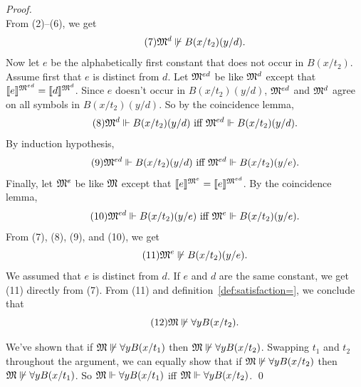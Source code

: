 \begin{proof}
\begin{equation}
  \end{equation}
  From (2)--(6), we get
  \begin{equation}\tag{7}
    \mathfrak{M}^d \not\Vdash B(x/t_2)(y/d).
  \end{equation}
  Now let $e$ be the alphabetically first constant that does not occur in $B(x/t_2)$.
  Assume first that $e$ is distinct from $d$.
  Let $\mathfrak{M}^{ed}$ be like $\mathfrak{M}^d$ except that
  $\llbracket e \rrbracket^{\mathfrak{M}^{ed}} = \llbracket d \rrbracket^{\mathfrak{M}^d}$.
  Since $e$ doesn't occur in $B(x/t_2)(y/d)$,
  $\mathfrak{M}^{ed}$ and $\mathfrak{M}^d$ agree on all symbols in $B(x/t_2)(y/d)$.
  So by the coincidence lemma,
  \begin{equation}\tag{8}
    \mathfrak{M}^d \Vdash B(x/t_2)(y/d) \text{ iff } \mathfrak{M}^{ed} \Vdash B(x/t_2)(y/d).
  \end{equation}
  By induction hypothesis,
  \begin{equation}\tag{9}
    \mathfrak{M}^{ed} \Vdash B(x/t_2)(y/d)\text{ iff }\mathfrak{M}^{ed} \Vdash B(x/t_2)(y/e).
  \end{equation}
  Finally,
  let $\mathfrak{M}^e$ be like $\mathfrak{M}$ except that
  $\llbracket e \rrbracket^{\mathfrak{M}^e} = \llbracket e \rrbracket^{\mathfrak{M}^{ed}}$.
  By the coincidence lemma,
  \begin{equation}\tag{10}
    \mathfrak{M}^{ed} \Vdash B(x/t_2)(y/e) \text{ iff }\mathfrak{M}^{e} \Vdash B(x/t_2)(y/e).
  \end{equation}
  From (7), (8), (9), and (10), we get
  \begin{equation}\tag{11}
    \mathfrak{M}^e \not\Vdash B(x/t_2)(y/e).
  \end{equation}
  We assumed that $e$ is distinct from $d$.
  If $e$ and $d$ are the same constant,
  we get (11) directly from (7).
  From (11) and definition~\ref{def:satisfaction=},
  we conclude that
  \begin{equation}\tag{12}
    \mathfrak{M} \not\Vdash \forall y B(x/t_2).
  \end{equation}

  We've shown that
  if $\mathfrak{M} \not\Vdash \forall y B(x/t_1)$ then
  $\mathfrak{M} \not\Vdash \forall y B(x/t_2)$.
  Swapping $t_1$ and $t_2$ throughout the argument,
  we can equally show that
  if $\mathfrak{M} \not\Vdash \forall y B(x/t_2)$ then
  $\mathfrak{M} \not\Vdash \forall y B(x/t_1)$.
  So $\mathfrak{M} \Vdash \forall y B(x/t_1)$ iff
  $\mathfrak{M} \Vdash \forall y B(x/t_2)$.
  \qed
\end{proof}


